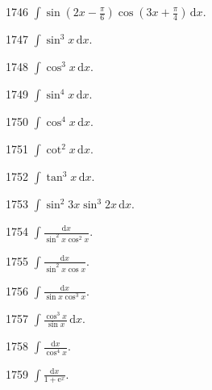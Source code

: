 \begin{prob}[S]{1746}
$\int \sin\left(2x - \frac{\pi}{6}\right)\cos\left(3x + \frac{\pi}{4}\right)\,\mathrm{d}x$.
\end{prob}

\begin{prob}[S]{1747}
$\int \sin^3 x\,\mathrm{d}x$.
\end{prob}

\begin{prob}[S]{1748}
$\int \cos^3 x\,\mathrm{d}x$.
\end{prob}

\begin{prob}[S]{1749}
$\int \sin^4 x\,\mathrm{d}x$.
\end{prob}

\begin{prob}[S]{1750}
$\int \cos^4 x\,\mathrm{d}x$.
\end{prob}

\begin{prob}[S]{1751}
$\int \cot^2 x\,\mathrm{d}x$.
\end{prob}

\begin{prob}[S]{1752}
$\int \tan^3 x\,\mathrm{d}x$.
\end{prob}

\begin{prob}[S]{1753}
$\int \sin^2 3x \sin^3 2x\,\mathrm{d}x$.
\end{prob}

\begin{prob}[S]{1754}
$\int \frac{\mathrm{d}x}{\sin^2 x \cos^2 x}$.
\end{prob}

\begin{prob}[S]{1755}
$\int \frac{\mathrm{d}x}{\sin^2 x \cos x}$.
\end{prob}

\begin{prob}[S]{1756}
$\int \frac{\mathrm{d}x}{\sin x \cos^3 x}$.
\end{prob}

\begin{prob}[S]{1757}
$\int \frac{\cos^3 x}{\sin x}\,\mathrm{d}x$.
\end{prob}

\begin{prob}[S]{1758}
$\int \frac{\mathrm{d}x}{\cos^4 x}$.
\end{prob}

\begin{prob}[S]{1759}
$\int \frac{\mathrm{d}x}{1 + \mathrm{e}^x}$.
\end{prob}

